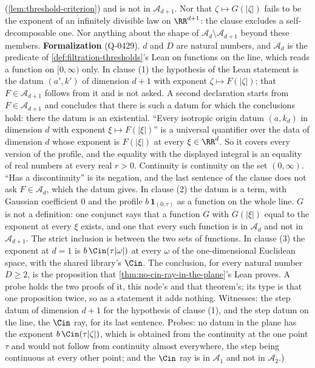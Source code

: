 \begin{proposition}
{(\ref{lem:threshold-criterion}) and is not in $\mathcal{A}_{d+1}$. Nor that
$\zeta \mapsto G(|\zeta|)$ fails to be the exponent of an infinitely divisible law on
$\RR^{d+1}$: the clause excludes a self-decomposable one. Nor anything about the shape of
$\mathcal{A}_d \setminus \mathcal{A}_{d+1}$ beyond these members. \textbf{Formalization}
(Q-0429). $d$ and $D$ are natural numbers, and $\mathcal{A}_d$ is the predicate of
\ref{def:filtration-thresholds}'s Lean on functions on the line, which reads a function on
$[0,\infty)$ only. In clause (1) the hypothesis of the Lean statement is the datum $(a',k')$ of
dimension $d + 1$ with exponent $\zeta \mapsto F(|\zeta|)$; that $F \in \mathcal{A}_{d+1}$
follows from it and is not asked. A second declaration starts from $F \in \mathcal{A}_{d+1}$ and
concludes that there is such a datum for which the conclusions hold: there the datum is an
existential. ``Every isotropic origin datum $(a,k_d)$ in dimension $d$ with exponent
$\xi \mapsto F(|\xi|)$'' is a universal quantifier over the data of dimension $d$ whose exponent
is $F(|\xi|)$ at every $\xi \in \RR^d$. So it covers every version of the profile, and the
equality with the displayed integral is an equality of real numbers at every real $r > 0$.
Continuity is continuity on the set $(0,\infty)$. ``Has a discontinuity'' is its negation, and the
last sentence of the clause does not ask $F \in \mathcal{A}_d$, which the datum gives. In clause
(2) the datum is a term, with Gaussian coefficient $0$ and the profile $b\,\mathbf 1_{(0,\tau)}$
as a function on the whole line. $G$ is not a definition: one conjunct says that a function $G$
with $G(|\xi|)$ equal to the exponent at every $\xi$ exists, and one that every such function is
in $\mathcal{A}_d$ and not in $\mathcal{A}_{d+1}$. The strict inclusion is between the two sets
of functions. In clause (3) the exponent at $d = 1$ is $b\,\Cin(\tau|\omega|)$ at every $\omega$
of the one-dimensional Euclidean space, with the shared library's $\Cin$. The conclusion, for
every natural number $D \ge 2$, is the proposition that \ref{thm:no-cin-ray-in-the-plane}'s Lean
proves. A probe holds the two proofs of it, this node's and that theorem's; its type is that one
proposition twice, so as a statement it adds nothing. Witnesses: the step datum of dimension
$d + 1$ for the hypothesis of clause (1), and the step datum on the line, the $\Cin$ ray, for its last
sentence. Probes: no datum in the plane has the exponent $b\,\Cin(\tau|\zeta|)$, which is
obtained from the continuity at the one point $\tau$ and would not follow from continuity almost
everywhere, the step being continuous at every other point; and the $\Cin$ ray is in
$\mathcal{A}_1$ and not in $\mathcal{A}_2$.)}
\end{proposition}

